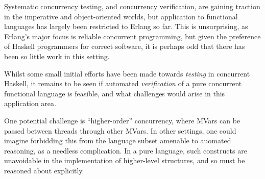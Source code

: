 Systematic concurrency testing, and concurrency verification, are
gaining traction in the imperative and object-oriented worlds, but
application to functional languages has largely been restricted to
Erlang so far. This is unsurprising, as Erlang's major focus is
reliable concurrent programming, but given the preference of Haskell
programmers for correct software, it is perhaps odd that there has
been so little work in this setting.

Whilst some small initial efforts have been made towards
\textit{testing} in concurrent Haskell, it remains to be seen if
automated \textit{verification} of a pure concurrent functional
language is feasible, and what challenges would arise in this
application area.

One potential challenge is ``higher-order'' concurrency, where MVars
can be passed between threads through other MVars. In other settings,
one could imagine forbidding this from the language subset amenable to
auomated reasoning, as a needless complication. In a pure language,
such constructs are unavoidable in the implementation of higher-level
structures, and so must be reasoned about explicitly.
